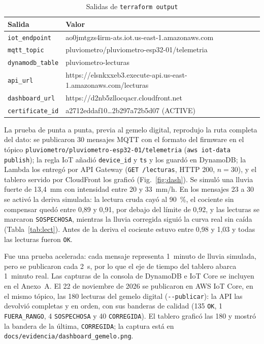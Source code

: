 \documentclass[10pt,twocolumn,letterpaper]{article}
\begin{document}
\begin{table}[t]
\caption{Salidas de \texttt{terraform output}}
\label{tab:out}
\centering\scriptsize
\begin{tabularx}{\columnwidth}{@{}l>{\raggedright\arraybackslash\ttfamily}X@{}}
\toprule
Salida & Valor\\
\midrule
\texttt{iot\_endpoint} & ao0jmtgzs4irm-ats.\allowbreak iot.us-east-1.amazonaws.com\\
\texttt{mqtt\_topic} & pluviometro/\allowbreak pluviometro-esp32-01/\allowbreak telemetria\\
\texttt{dynamodb\_table} & pluviometro-lecturas\\
\texttt{api\_url} & https://elsnkxxeb3.execute-api.us-east-1.\allowbreak amazonaws.com/lecturas\\
\texttt{dashboard\_url} & https://d2nb5zllocqacr.cloudfront.net\\
\texttt{certificate\_id} & a2712eddaf10\ldots 2b297a72b5d07 (ACTIVE)\\
\bottomrule
\end{tabularx}
\end{table}

La prueba de punta a punta, previa al gemelo digital, reprodujo la ruta completa del dato: se publicaron 30 mensajes MQTT con el formato del firmware en el tópico \texttt{pluviometro/\allowbreak pluviometro-esp32-01/\allowbreak telemetria} (\texttt{aws iot-data publish}); la regla IoT añadió \texttt{device\_id} y \texttt{ts} y los guardó en DynamoDB; la Lambda los entregó por API Gateway (\texttt{GET /lecturas}, HTTP 200, $n=30$), y el tablero servido por CloudFront los graficó (Fig.~\ref{fig:dash}). Se simuló una lluvia fuerte de 13,4~mm con intensidad entre 20 y 33~mm/h. En los mensajes 23 a 30 se activó la deriva simulada: la lectura cruda cayó al 90~\%, el cociente sin compensar quedó entre 0,89 y 0,91, por debajo del límite de 0,92, y las lecturas se marcaron \texttt{SOSPECHOSA}, mientras la lluvia corregida siguió la curva real sin caída (Tabla~\ref{tab:lect}). Antes de la deriva el cociente estuvo entre 0,98 y 1,03 y todas las lecturas fueron \texttt{OK}.

Fue una prueba acelerada: cada mensaje representa 1~minuto de lluvia simulada, pero se publicaron cada 2~s, por lo que el eje de tiempo del tablero abarca 1~minuto real. Las capturas de la consola de DynamoDB e IoT Core se incluyen en el Anexo~A. El 22 de noviembre de 2026 se publicaron en AWS IoT Core, en el mismo tópico, las 180 lecturas del gemelo digital (\texttt{-{}-publicar}): la API las devolvió completas y en orden, con sus banderas de calidad (135 \texttt{OK}, 1 \texttt{FUERA\_RANGO}, 4 \texttt{SOSPECHOSA} y 40 \texttt{CORREGIDA}). El tablero graficó las 180 y mostró la bandera de la última, \texttt{CORREGIDA}; la captura está en \texttt{docs/\allowbreak evidencia/\allowbreak dashboard\_gemelo.png}.
\end{document}

